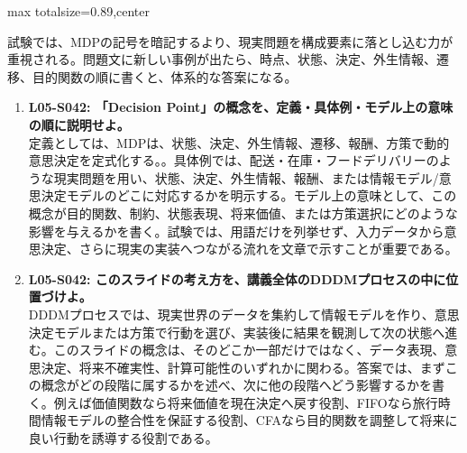 \begin{minipage}[t]{0.58\textwidth}
\begin{adjustbox}{max totalsize={\textwidth}{0.89\textheight},center}
\begin{minipage}{\textwidth}
試験では、MDPの記号を暗記するより、現実問題を構成要素に落とし込む力が重視される。問題文に新しい事例が出たら、時点、状態、決定、外生情報、遷移、目的関数の順に書くと、体系的な答案になる。\par{}\begin{enumerate}\item \textbf{L05-S042: 「Decision Point」の概念を、定義・具体例・モデル上の意味の順に説明せよ。}\\定義としては、MDPは、状態、決定、外生情報、遷移、報酬、方策で動的意思決定を定式化する。。具体例では、配送・在庫・フードデリバリーのような現実問題を用い、状態、決定、外生情報、報酬、または情報モデル/意思決定モデルのどこに対応するかを明示する。モデル上の意味として、この概念が目的関数、制約、状態表現、将来価値、または方策選択にどのような影響を与えるかを書く。試験では、用語だけを列挙せず、入力データから意思決定、さらに現実の実装へつながる流れを文章で示すことが重要である。\item \textbf{L05-S042: このスライドの考え方を、講義全体のDDDMプロセスの中に位置づけよ。}\\DDDMプロセスでは、現実世界のデータを集約して情報モデルを作り、意思決定モデルまたは方策で行動を選び、実装後に結果を観測して次の状態へ進む。このスライドの概念は、そのどこか一部だけではなく、データ表現、意思決定、将来不確実性、計算可能性のいずれかに関わる。答案では、まずこの概念がどの段階に属するかを述べ、次に他の段階へどう影響するかを書く。例えば価値関数なら将来価値を現在決定へ戻す役割、FIFOなら旅行時間情報モデルの整合性を保証する役割、CFAなら目的関数を調整して将来に良い行動を誘導する役割である。\end{enumerate}
\end{minipage}
\end{adjustbox}
\end{minipage}


